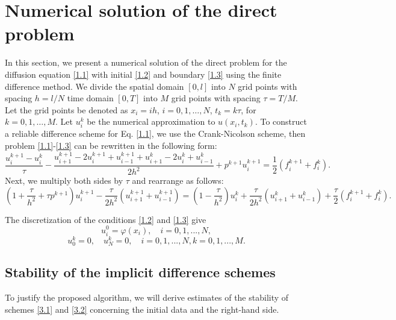 \documentclass[reqno]{amsart}
\begin{document}
\section{Numerical solution of the direct problem}\label{4}
In this section, we present a numerical solution of the direct problem for the diffusion equation \eqref{1.1} with initial \eqref{1.2} and boundary \eqref{1.3} using the finite difference method.
We divide the spatial domain $[0,l]$ into $N$ grid points with spacing $h=l/N$ time domain $[0, T]$ into $M$ grid points with spacing $\tau=T/M$. Let the grid points be denoted as  $x_i=ih$, $i=0,1,…, N$, $t_k=k\tau$, for $k=0,1,…, M.$ Let $u_i^k$ be the numerical approximation to $u(x_i, t_k)$. 
To construct a reliable difference scheme for Eq. \eqref{1.1}, we  use the Crank-Nicolson scheme, then problem \eqref{1.1}-\eqref{1.3} can be rewritten in the following form:
\begin{equation}\label{3.1}
\frac{u_i^{k+1} - u_i^{k}}{\tau} - \frac{u_{i+1}^{k+1} - 2u_i^{k+1} + u_{i-1}^{k+1} + u_{i+1}^{k} - 2u_i^{k} + u_{i-1}^{k}}{2h^2} + p^{k+1} u_i^{k+1} = \frac{1}{2}(f_i^{k+1}+f_i^{k}). 
\end{equation}
Next, we multiply both sides by $\tau$ and rearrange as follows:
\begin{equation} \label{3.2}
(1 + \frac{\tau}{h^2} + \tau p^{k+1})u_i^{k+1} - \frac{\tau}{2h^2}(u_{i+1}^{k+1} + u_{i-1}^{k+1}) = (1 - \frac{\tau}{h^2})u_i^k + \frac{\tau}{2h^2}(u_{i+1}^k + u_{i-1}^k) + \frac{\tau}{2}(f_i^{k+1} + f_i^k).
\end{equation}

The discretization of the conditions \eqref{1.2} and \eqref{1.3} give 
\[
 u_i^0 = \varphi(x_i), \quad i = 0, 1, . . . ,N,
\]
\begin{equation} \label{3.3}
u_0^k = 0, \quad u_N^k = 0,  \quad i = 0, 1, . . . ,N, k = 0, 1, . . . , M.
\end{equation}
\subsection{Stability of the implicit difference schemes}
To justify the proposed algorithm, we will derive estimates of the stability of schemes \eqref{3.1} and \eqref{3.2} concerning the initial data and the right-hand side.
\end{document}
